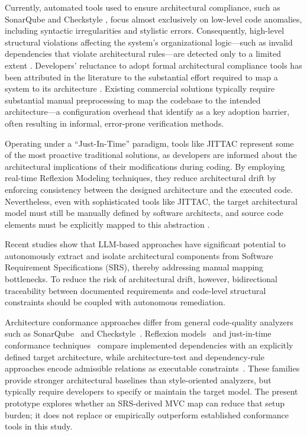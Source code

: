 Currently, automated tools used to ensure architectural compliance,
such as SonarQube \citep{SonarQube} and Checkstyle
\citep{Checkstyle}, focus almost exclusively on low-level code
anomalies, including syntactic irregularities and stylistic errors.
Consequently, high-level structural violations affecting the system's
organizational logic---such as invalid dependencies that violate
architectural rules---are detected only to a limited extent \citep{Fontana2017}.
Developers' reluctance to adopt formal architectural compliance tools
has been attributed in the literature to the substantial effort
required to map a system to its architecture \citep{Ali2018}. Existing commercial solutions typically
require substantial manual preprocessing to map the codebase to the
intended architecture---a configuration overhead that \citet{Ali2018} identify as a key adoption barrier, often resulting in
informal, error-prone verification methods.

Operating under a ``Just-In-Time'' paradigm, tools like JITTAC
\citep{Buckley2013} represent some of the most proactive traditional
solutions, as developers are informed about the architectural
implications of their modifications during coding. By employing
real-time Reflexion Modeling \citep{Murphy2001} techniques, they reduce
architectural drift by enforcing consistency between the designed
architecture and the executed code. Nevertheless, even with
sophisticated tools like JITTAC, the target architectural model must
still be manually defined by software architects, and source code
elements must be explicitly mapped to this abstraction
\citep{Buckley2013}.

Recent studies \citep{Fuchs2025, Helmi2025} show that LLM-based
approaches have significant potential to autonomously extract and
isolate architectural components from Software Requirement
Specifications (SRS), thereby addressing manual mapping bottlenecks.
To reduce the risk of architectural drift, however, bidirectional
traceability between documented requirements and code-level structural
constraints should be coupled with autonomous remediation.

Architecture conformance approaches differ from general code-quality analyzers such as SonarQube~\citep{SonarQube} and Checkstyle~\citep{Checkstyle}. Reflexion models~\citep{Murphy2001} and just-in-time conformance techniques~\citep{Buckley2013} compare implemented dependencies with an explicitly defined target architecture, while architecture-test and dependency-rule approaches encode admissible relations as executable constraints~\citep{Pruijt2017}. These families provide stronger architectural baselines than style-oriented analyzers, but typically require developers to specify or maintain the target model. The present prototype explores whether an SRS-derived MVC map can reduce that setup burden; it does not replace or empirically outperform established conformance tools in this study.

